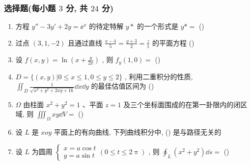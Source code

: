 \subsubsection{选择题(每小题 $3$ 分, 共 $24$ 分)}
\begin{enumerate}
	\item 方程 $y''-3 y'+2 y=\ee^{x}$ 的待定特解 $y*$ 的一个形式是 $y*=$ (\hspace{1pc})
	
	\item 过点 $(3,1,-2)$ 且通过直线 $\frac{x-4}{5}=\frac{y+3}{2}=\frac{z}{1}$ 的平面方程 (\hspace{1pc})
	
	\item 设 $f(x,y)=\ln\left(x+\frac{y}{2x} \right)$ , 则 $f_{y}(1,0)=$ (\hspace{1pc})
	
	\item $D=\{ (x,y)|0\leq x\leq 1,0\leq y\leq 2 \}$ , 利用二重积分的性质, $\iint_{D}\frac{1}{\sqrt{x^2+y^2+2xy+16}}\dd x\dd y$ 的最佳估值区间为 (\hspace{1pc})
	
	\item $\Omega$ 由柱面 $x^2+y^2=1$ 、平面 $z=1$ 及三个坐标面围成的在第一卦限内的闭区域, 则 $\iiint_{\Omega}xy\dd V=$ (\hspace{1pc})
	
	\item 设 $L$ 是 $xoy$ 平面上的有向曲线, 下列曲线积分中, (\hspace{1pc}) 是与路径无关的
	
	\item 设 $L$ 为圆周 $\begin{cases}
	x=a\cos t\\
	y=a\sin t
	\end{cases}(0\leq t\leq 2\uppi)$ , 则 $\oint_{L}\left(x^{2}+y^{2}\right) \dd s=$ (\hspace{1pc})
	

\end{enumerate}
